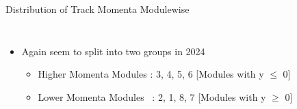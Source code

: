 \begin{frame}{Distribution of Track Momenta Modulewise}
\begin{columns}
\begin{column}{0.6\linewidth}
\begin{figure}
            \end{figure}
        \end{column}
    \end{columns}

    \begin{itemize}
        \small
        \item Again seem to split into two groups in 2024
        \begin{itemize}
            \item Higher Momenta Modules : 3, 4, 5, 6  [Modules with y $\leq$ 0]
            \item Lower Momenta Modules \ : 2, 1, 8, 7 [Modules with y $\geq$ 0]
        \end{itemize}
    \end{itemize}
\end{frame}

    
